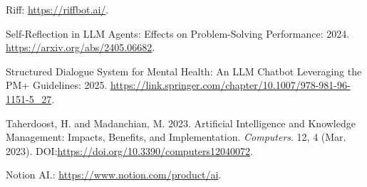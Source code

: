\documentclass[11pt]{article}
\begin{document}
\begin{thebibliography}{99}
 Riff: \url{https://riffbot.ai/}.

 Self-Reflection in LLM Agents: Effects on Problem-Solving Performance: 2024. \url{https://arxiv.org/abs/2405.06682}.

 Structured Dialogue System for Mental Health: An LLM Chatbot Leveraging the PM+ Guidelines: 2025. \url{https://link.springer.com/chapter/10.1007/978-981-96-1151-5_27}.

 Taherdoost, H. and Madanchian, M. 2023. Artificial Intelligence and Knowledge Management: Impacts, Benefits, and Implementation. \textit{Computers}. 12, 4 (Mar. 2023). DOI:\url{https://doi.org/10.3390/computers12040072}.

 Notion AI.: \url{https://www.notion.com/product/ai}.
\end{thebibliography}
\end{document}
